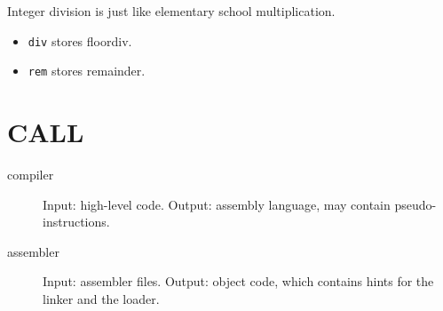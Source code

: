Integer division is just like elementary school multiplication.
\begin{itemize}
	\item \texttt{div} stores floordiv.
	\item \texttt{rem} stores remainder.
\end{itemize}

\section{CALL}
\begin{description}
	\item[compiler] Input: high-level code. Output: assembly language, may contain pseudo-instructions.
	\item[assembler] Input: assembler files. Output: object code, which contains hints for the linker and the loader.
\end{description}
